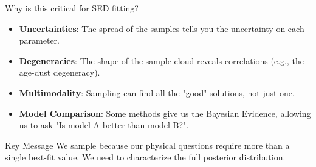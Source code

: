 \documentclass[aspectratio=169]{beamer}
\newcommand{\keyterm}[1]{\textbf{\textcolor{C0}{#1}}}
\begin{document}
\begin{frame}
    \begin{block}{Why is this critical for SED fitting?}
        \begin{itemize}
            \item \keyterm{Uncertainties}: The spread of the samples tells you the uncertainty on each parameter.
            \item \keyterm{Degeneracies}: The shape of the sample cloud reveals correlations (e.g., the age-dust degeneracy).
            \item \keyterm{Multimodality}: Sampling can find all the "good" solutions, not just one.
            \item \keyterm{Model Comparison}: Some methods give us the Bayesian Evidence, allowing us to ask "Is model A better than model B?".
        \end{itemize}
    \end{block}
    
    \begin{alertblock}{Key Message}
        We sample because our physical questions require more than a single best-fit value. We need to characterize the full posterior distribution.
    \end{alertblock}
\end{frame}
\end{document}
